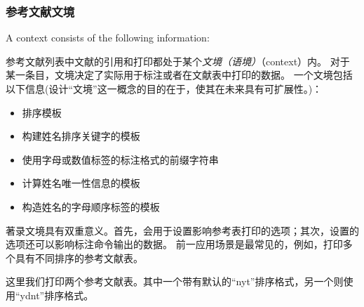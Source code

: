 \subsubsection{参考文献文境}%
\label{use:bib:context}


 A context consists of the following information:

参考文献列表中文献的引用和打印都处于某个\emph{文境（语境）}（context）内。
对于某一条目，文境决定了实际用于标注或者在文献表中打印的数据。
一个文境包括以下信息(设计“文境”这一概念的目的在于，使其在未来具有可扩展性。)：

\begin{itemize}
 \item %
 排序模板
 \item %
 构建姓名排序关键字的模板
 \item %
 使用字母或数值标签的标注格式的前缀字符串
 \item %
 计算姓名唯一性信息的模板
 \item %
 构造姓名的字母顺序标签的模板
\end{itemize}
%
著录文境具有双重意义。首先，会用于设置影响参考表打印的选项；其次，设置的选项还可以影响标注命令输出的数据。
前一应用场景是最常见的，例如，打印多个具有不同排序的参考文献表。

\begin{ltxexample}
\usepackage[sorting=nyt]{biblatex}

\cite{one}
\cite{two}
\printbibliography
\newrefcontext[sorting=ydnt]
\printbibliography
\end{ltxexample}
%
这里我们打印两个参考文献表。其中一个带有默认的“nyt”排序格式，另一个则使用“ydnt”排序格式。

